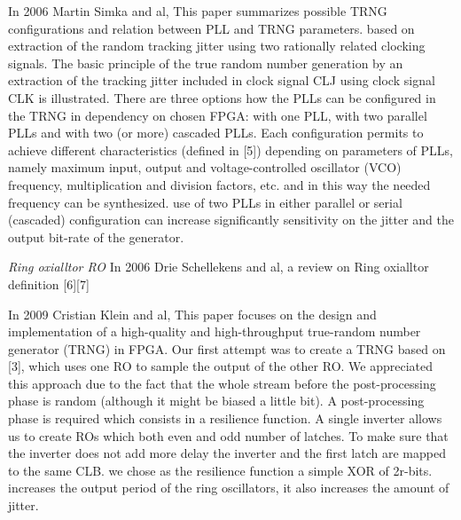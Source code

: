 In 2006 Martin Simka and al, This paper summarizes possible TRNG configurations and relation between PLL and TRNG parameters. based on extraction of the random tracking jitter using two rationally related clocking signals. The basic principle of the true random number generation by an extraction of the tracking jitter included in clock signal CLJ using clock signal CLK is illustrated. There are three options how the PLLs can be configured in the TRNG in dependency on chosen FPGA: with one PLL, with two parallel PLLs and with two (or more) cascaded PLLs. Each configuration permits to achieve different characteristics (defined in [5]) depending on parameters of PLLs, namely maximum input, output and voltage-controlled oscillator (VCO) frequency, multiplication and division factors, etc. and in this way the needed frequency can be synthesized. use of two PLLs in either parallel or serial (cascaded) configuration can increase significantly sensitivity on the jitter and the output bit-rate of the generator. 

\textit{Ring oxialltor RO}
In 2006 Drie Schellekens and al, a review on Ring oxialltor definition [6][7]

In 2009 Cristian Klein and al, This paper focuses on the design and implementation of a high-quality and high-throughput true-random number generator (TRNG) in FPGA. Our first attempt was to create a TRNG based on [3], which uses one RO to sample the output of the other RO. We appreciated this approach due to the fact that the whole stream before the post-processing phase is random (although it might be biased a little bit). A post-processing phase is required which consists in a resilience function. A single inverter allows us to create ROs which both even and odd number of latches. To make sure that the inverter does not add more delay the inverter and the first latch are mapped to the same CLB. we chose as the resilience function a simple XOR of 2r-bits. increases the output period of the ring oscillators, it also increases the amount of jitter.

